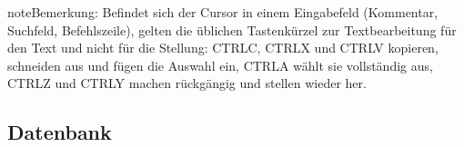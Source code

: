 \documentclass[letterpaper,10pt,german]{sphinxmanual}
\begin{document}
\begin{sphinxadmonition}{note}{Bemerkung:}
\sphinxAtStartPar
Befindet sich der Cursor in einem Eingabefeld (Kommentar, Suchfeld, Befehlszeile), gelten die üblichen Tastenkürzel zur Textbearbeitung für den Text und nicht für die Stellung: CTRL\sphinxhyphen{}C, CTRL\sphinxhyphen{}X und CTRL\sphinxhyphen{}V kopieren, schneiden aus und fügen die Auswahl ein, CTRL\sphinxhyphen{}A wählt sie vollständig aus, CTRL\sphinxhyphen{}Z und CTRL\sphinxhyphen{}Y machen rückgängig und stellen wieder her.
\end{sphinxadmonition}


\subsection{Datenbank}
\label{\detokenize{raccourcis:base-de-donnees}}\label{\detokenize{raccourcis:raccourcis-generaux}}
\end{document}
